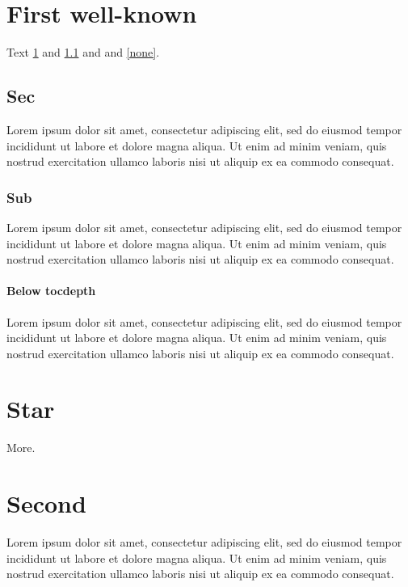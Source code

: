 \documentclass{report}
\begin{document}
\tableofcontents
\chapter{First well-known}\label{c1}
Text \ref{c1} and \ref{s1} and \pageref{s1} and \ref{none}.
\section{Sec}\label{s1}
Lorem ipsum dolor sit amet, consectetur adipiscing elit, sed do eiusmod tempor incididunt ut labore et dolore magna aliqua. Ut enim ad minim veniam, quis nostrud exercitation ullamco laboris nisi ut aliquip ex ea commodo consequat.
\subsection{Sub}
Lorem ipsum dolor sit amet, consectetur adipiscing elit, sed do eiusmod tempor incididunt ut labore et dolore magna aliqua. Ut enim ad minim veniam, quis nostrud exercitation ullamco laboris nisi ut aliquip ex ea commodo consequat.
\subsubsection{Below tocdepth}
Lorem ipsum dolor sit amet, consectetur adipiscing elit, sed do eiusmod tempor incididunt ut labore et dolore magna aliqua. Ut enim ad minim veniam, quis nostrud exercitation ullamco laboris nisi ut aliquip ex ea commodo consequat.
\chapter*{Star}
More.
\chapter{Second}
Lorem ipsum dolor sit amet, consectetur adipiscing elit, sed do eiusmod tempor incididunt ut labore et dolore magna aliqua. Ut enim ad minim veniam, quis nostrud exercitation ullamco laboris nisi ut aliquip ex ea commodo consequat.
\end{document}
